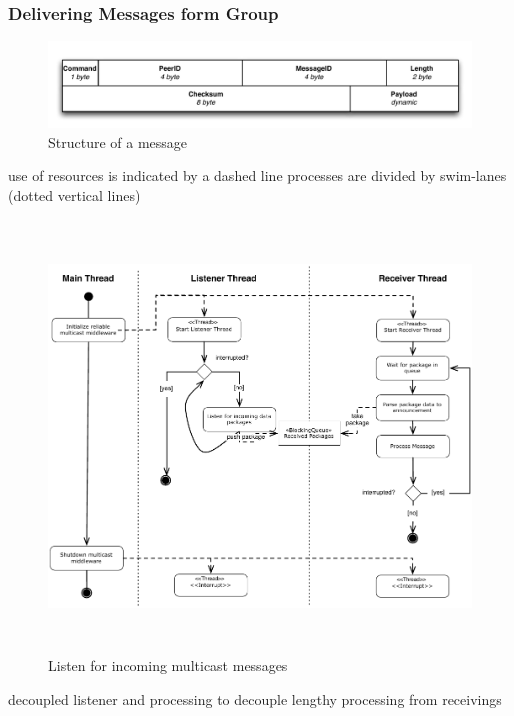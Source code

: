 \subsubsection{Delivering Messages form Group}


\begin{figure}[htbp]
    \centering
        \includegraphics[width=.9\textwidth]{figures/message.pdf}
    \caption{Structure of a message}
    \label{fig:figures_announcement}
\end{figure}

use of resources  is indicated by a dashed line 
processes are divided by swim-lanes (dotted vertical lines)

\begin{figure}[htbp]
    \centering
        \includegraphics[height=4.5in]{figures/receivePackets.pdf}
    \caption{Listen for incoming multicast messages}
    \label{fig:figures_processReceivePackage}
\end{figure}

decoupled listener and processing to decouple lengthy processing from receivings

